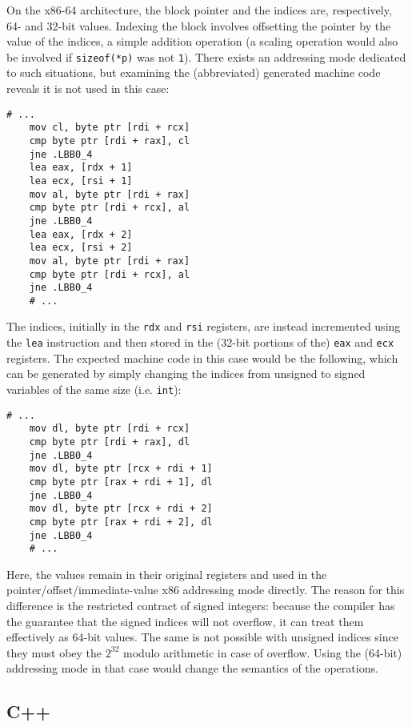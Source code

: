 On the x86-64 architecture, the block pointer and the indices are, respectively,
64- and 32-bit values.  Indexing the block involves offsetting the pointer by
the value of the indices, a simple addition operation (a scaling operation would
also be involved if \texttt{sizeof(*p)} was not \texttt{1}).  There exists an
addressing mode dedicated to such situations, but examining the (abbreviated)
generated machine code reveals it is not used in this case:

\begin{lstlisting}[style=x86]
    # ...
    mov cl, byte ptr [rdi + rcx]
    cmp byte ptr [rdi + rax], cl
    jne .LBB0_4
    lea eax, [rdx + 1]
    lea ecx, [rsi + 1]
    mov al, byte ptr [rdi + rax]
    cmp byte ptr [rdi + rcx], al
    jne .LBB0_4
    lea eax, [rdx + 2]
    lea ecx, [rsi + 2]
    mov al, byte ptr [rdi + rax]
    cmp byte ptr [rdi + rcx], al
    jne .LBB0_4
    # ...
\end{lstlisting}

The indices, initially in the \texttt{rdx} and \texttt{rsi} registers, are
instead incremented using the \texttt{lea} instruction and then stored in the
(32-bit portions of the) \texttt{eax} and \texttt{ecx} registers.  The expected
machine code in this case would be the following, which can be generated by
simply changing the indices from unsigned to signed variables of the same size
(i.e. \texttt{int}):

\begin{lstlisting}[style=x86]
    # ...
    mov dl, byte ptr [rdi + rcx]
    cmp byte ptr [rdi + rax], dl
    jne .LBB0_4
    mov dl, byte ptr [rcx + rdi + 1]
    cmp byte ptr [rax + rdi + 1], dl
    jne .LBB0_4
    mov dl, byte ptr [rcx + rdi + 2]
    cmp byte ptr [rax + rdi + 2], dl
    jne .LBB0_4
    # ...
\end{lstlisting}

Here, the values remain in their original registers and used in the
pointer/offset/immediate-value x86 addressing mode directly.  The reason for
this difference is the restricted contract of signed integers: because the
compiler has the guarantee that the signed indices will not overflow, it can
treat them effectively as 64-bit values.  The same is not possible with unsigned
indices since they must obey the $2^{32}$ modulo arithmetic in case of overflow.
Using the (64-bit) addressing mode in that case would change the semantics of
the operations.

\subsection{C++}

